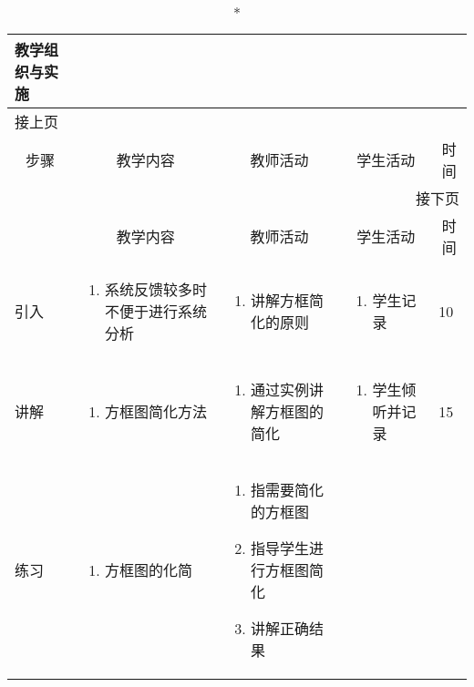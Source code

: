{%
\begin{landscape}

\begin{longtable}{|m{10mm}|m{50mm}|m{50mm}|m{50mm}|m{15mm}|}
\caption*{\huge 教学组织与实施}\\
\hline
\endfirsthead
\multicolumn{5}{l}{\small 接上页}\\
\hline
\multicolumn{1}{|c|}{步骤}&\multicolumn{1}{c|}{教学内容}&\multicolumn{1}{c|}{教师活动}&\multicolumn{1}{c|}{学生活动}&\multicolumn{1}{c|}{时间}\\
\hline
\endhead

\multicolumn{5}{r}{\small 接下页}\\
\endfoot
\hline
\endlastfoot
\multicolumn{1}{|c|}{步骤}&\multicolumn{1}{c|}{教学内容}&\multicolumn{1}{c|}{教师活动}&\multicolumn{1}{c|}{学生活动}&\multicolumn{1}{c|}{时间}\\\hline
引入&\begin{enumerate}
\item 系统反馈较多时不便于进行系统分析
\end{enumerate} &\begin{enumerate}
\item 讲解方框简化的原则
\end{enumerate} &\begin{enumerate}
\item 学生记录
\end{enumerate} &10 \\\hline
讲解&\begin{enumerate}
\item 方框图简化方法
\end{enumerate}
 &\begin{enumerate}
\item 通过实例讲解方框图的简化
\end{enumerate} &\begin{enumerate}
\item 学生倾听并记录
\end{enumerate} &15 \\\hline
练习&\begin{enumerate}
\item 方框图的化简
\end{enumerate}
&\begin{enumerate}
\item 指需要简化的方框图
\item 指导学生进行方框图简化
\item 讲解正确结果
\end{enumerate} &\begin{enumerate}

\end{enumerate}
\end{longtable}
\end{landscape}}
